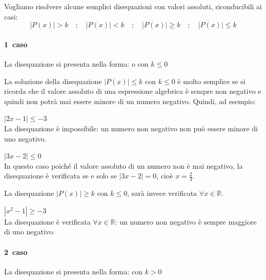 Vogliamo risolvere alcune semplici disequazioni con valori assoluti, 
riconducibili ai casi:
$$|P(x)|>k \quad; \quad |P(x)|<k\quad; \quad |P(x)|\geq k\quad; \quad |P(x)|\leq k$$


\paragraph{1\textdegree~caso} La disequazione si presenta nella forma:  
 o  con $k\leq 0$

\vspace{4pt}

La soluzione della disequazione $|P(x)|\leq k$ con $k\leq 0$ è molto semplice 
se si ricorda che il valore assoluto di una espressione algebrica è sempre non 
negativo e quindi non potrà mai essere minore di un numero negativo. Quindi, ad esempio:

\begin{esempio}  
$|2x-1|\leq -3$ \\[4pt] La disequazione è impossibile: un numero non negativo non può essere minore di uno negativo.
\end{esempio}
\begin{esempio} $|3x-2|\leq 0$ \\[4pt] In questo caso poiché il 
valore assoluto di un numero non è mai negativo, la disequazione è verificata 
se e solo se $|3x-2|=0$, cioè $x=\frac{2}{3}$.
\end{esempio}

La disequazione $|P(x)|\geq k$ con $k\leq 0$, sarà invece verificata $\forall x 
\in \mathbb{R}$.

\begin{esempio} $|x^2-1|\geq -3$\\[4pt] La disequazione è 
verificata $\forall x \in \mathbb{R}$: un numero non negativo è sempre maggiore di uno negativo.
\end{esempio}

\paragraph{2\textdegree~caso} La disequazione si presenta nella forma:  
 con $k> 0$

